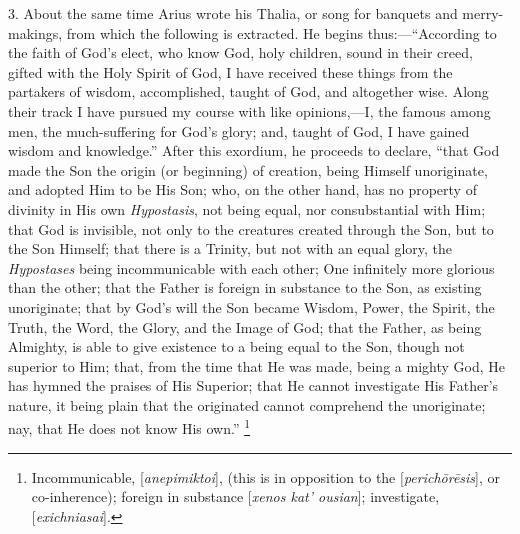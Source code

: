 3. About the same time Arius wrote his Thalia, or song for banquets
and merry-makings, from which the following is extracted. He begins
thus:—``According to the faith of God's elect, who know God,
holy children, sound in their creed, gifted with the Holy Spirit of
God, I have received these things from the partakers of wisdom,
accomplished, taught of God, and altogether wise. Along their track I
have pursued my course with like opinions,—I, the famous among men,
the much-suffering for God's glory; and, taught of God, I have gained
wisdom and knowledge.'' After this exordium, he proceeds to
declare, ``that God made the Son the origin (or beginning) of
creation, being Himself unoriginate, and adopted Him to be His
Son; who, on the other hand, has no property of divinity in His own \emph{Hypostasis},
not being equal, nor consubstantial with Him; that God is invisible,
not only to the creatures created through the Son, but to the Son
Himself; that there is a Trinity, but not with an equal glory, the \emph{Hypostases}
being incommunicable with each other; One infinitely more glorious
than the other; that the Father is foreign in substance to the Son, as
existing unoriginate; that by God's will the Son became Wisdom, Power,
the Spirit, the Truth, the Word, the Glory, and the Image of God; that
the Father, as being Almighty, is able to give existence to a being
equal to the Son, though not superior to Him; that, from the time that
He was made, being a mighty God, He has hymned the praises of His
Superior; that He cannot investigate His Father's nature, it being
plain that the originated cannot comprehend the unoriginate; nay, that
He does not know His own.'' \footnote{Incommunicable, [\emph{anepimiktoi}],
(this is in opposition to the [\emph{perich\={o}r\={e}sis}], or
co-inherence); foreign in substance [\emph{xenos kat' ousian}];
investigate, [\emph{exichniasai}].}

